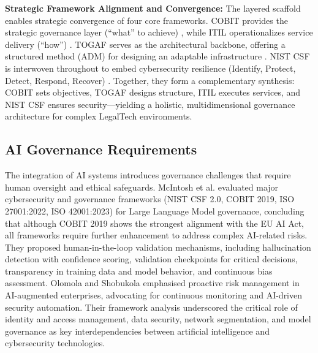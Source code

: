 \documentclass{IET-Conf-Paper}
\begin{document}
    \textbf{Strategic Framework Alignment and Convergence: }
    The layered scaffold enables strategic convergence of four core frameworks. COBIT provides the strategic governance layer (“what” to achieve) \cite{M_Suresh_2024, Tim_Huygh_2018}, while ITIL operationalizes service delivery (“how”) \cite{M_Suresh_2024, Tim_Huygh_2018}. TOGAF serves as the architectural backbone, offering a structured method (ADM) for designing an adaptable infrastructure \cite{Iqbal_Santosa_2023, Andreas_Schmitz_2022}. NIST CSF is interwoven throughout to embed cybersecurity resilience (Identify, Protect, Detect, Respond, Recover) \cite{Diah_Sulistyowati_2020}. Together, they form a complementary synthesis: COBIT sets objectives, TOGAF designs structure, ITIL executes services, and NIST CSF ensures security—yielding a holistic, multidimensional governance architecture for complex LegalTech environments.
    \vspace{-3mm}
    \subsection{AI Governance Requirements}
    The integration of AI systems introduces governance challenges that require human oversight and ethical safeguards. McIntosh et al. \cite{McIntosh2024From} evaluated major cybersecurity and governance frameworks (NIST CSF 2.0, COBIT 2019, ISO 27001:2022, ISO 42001:2023) for Large Language Model governance, concluding that although COBIT 2019 shows the strongest alignment with the EU AI Act, all frameworks require further enhancement to address complex AI-related risks. They proposed human-in-the-loop validation mechanisms, including hallucination detection with confidence scoring, validation checkpoints for critical decisions, transparency in training data and model behavior, and continuous bias assessment.
    Olomola and Shobukola \cite{Olomola2022Comprehensive} emphasised proactive risk management in AI-augmented enterprises, advocating for continuous monitoring and AI-driven security automation. Their framework analysis underscored the critical role of identity and access management, data security, network segmentation, and model governance as key interdependencies between artificial intelligence and cybersecurity technologies.
    
\end{document}
